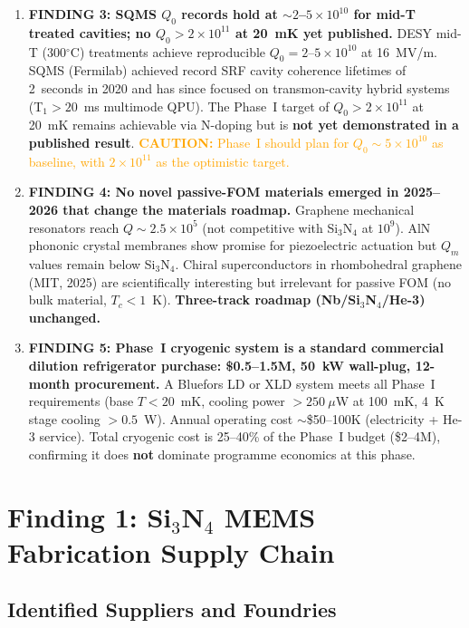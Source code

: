 \documentclass[11pt]{article}
\theoremstyle{definition}
\theoremstyle{remark}
\newcommand{\ee}[1]{\times 10^{#1}}
\newcommand{\caution}[1]{\textcolor{orange}{\textbf{CAUTION:} #1}}
\begin{document}
\begin{tcolorbox}[colback=blue!5!white, colframe=blue!50!black,
  title=\textbf{W4i10 TOP 5 FINDINGS --- Ranked by Programme Impact}]
\begin{enumerate}
\item \textbf{FINDING 3: SQMS $Q_0$ records hold at $\sim 2$--$5 \ee{10}$
for mid-T treated cavities; no $Q_0 > 2\ee{11}$ at 20~mK yet published.}
DESY mid-T (300$^\circ$C) treatments achieve reproducible $Q_0 = 2$--$5\ee{10}$
at 16~MV/m. SQMS (Fermilab) achieved record SRF cavity coherence lifetimes
of 2~seconds in 2020 and has since focused on transmon-cavity hybrid
systems (T$_1 > 20$~ms multimode QPU). The Phase~I target of
$Q_0 > 2\ee{11}$ at 20~mK remains achievable via N-doping but is
\textbf{not yet demonstrated in a published result}.
\caution{Phase~I should plan for $Q_0 \sim 5\ee{10}$ as baseline,
with $2\ee{11}$ as the optimistic target.}

\item \textbf{FINDING 4: No novel passive-FOM materials emerged in
2025--2026 that change the materials roadmap.} Graphene mechanical
resonators reach $Q \sim 2.5\ee{5}$ (not competitive with Si$_3$N$_4$
at $10^9$). AlN phononic crystal membranes show promise for
piezoelectric actuation but $Q_m$ values remain below Si$_3$N$_4$.
Chiral superconductors in rhombohedral graphene (MIT, 2025) are
scientifically interesting but irrelevant for passive FOM (no bulk
material, $T_c < 1$~K). \textbf{Three-track roadmap (Nb/Si$_3$N$_4$/He-3)
unchanged.}

\item \textbf{FINDING 5: Phase~I cryogenic system is a standard
commercial dilution refrigerator purchase: \$0.5--1.5M, 50~kW wall-plug,
12-month procurement.} A Bluefors LD or XLD system meets all Phase~I
requirements (base $T < 20$~mK, cooling power $> 250~\mu$W at 100~mK,
4~K stage cooling $> 0.5$~W). Annual operating cost $\sim$\$50--100K
(electricity + He-3 service). Total cryogenic cost is 25--40\% of the
Phase~I budget (\$2--4M), confirming it does \textbf{not} dominate
programme economics at this phase.
\end{enumerate}
\end{tcolorbox}


\section{Finding 1: Si$_3$N$_4$ MEMS Fabrication Supply Chain}
\label{sec:si3n4_supply}

\subsection{Identified Suppliers and Foundries}
\end{document}

